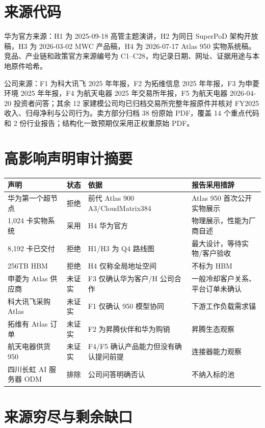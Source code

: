 \section{来源代码}

华为官方来源：H1 为 2025-09-18 高管主题演讲，H2 为同日 SuperPoD 架构开放稿，H3 为 2026-03-02 MWC 产品稿，H4 为 2026-07-17 Atlas 950 实物系统稿。竞品、产业链和政策官方来源编号为 C1--C28，均记录日期、网址、证据用途与本地原件哈希。

公司来源：F1 为科大讯飞 2025 年年报，F2 为拓维信息 2025 年年报，F3 为申菱环境 2025 年年报，F4 为航天电器 2025 年交易所年报，F5 为航天电器 2026-04-20 投资者问答；其余 12 家建模公司均已归档交易所完整年报原件并核对 FY2025 收入、归母净利与公司行为。卖方部分归档 38 份原始 PDF，覆盖 14 个重点代码和 2 份行业报告；结构化一致预期仅采用正权重原始 PDF。

\section{高影响声明审计摘要}

\begin{longtable}{L{4.0cm}L{2.4cm}L{3.4cm}L{3.4cm}}
\toprule
\textbf{声明} & \textbf{状态} & \textbf{依据} & \textbf{报告采用措辞}\\
\midrule
\endhead
华为第一个超节点 & 拒绝 & 前代 Atlas 900 A3/CloudMatrix384 & Atlas 950 首次公开实物展示\\
1,024 卡实物系统 & 采用 & H4 华为官方 & 物理展示，性能为厂商自述\\
8,192 卡已交付 & 拒绝 & H1/H3 为 Q4 路线图 & 最大设计，等待实物/客户验收\\
256TB HBM & 拒绝 & H4 仅称全局地址空间 & 不标为 HBM\\
申菱为 Atlas 供应商 & 未证实 & F3 仅确认华为客户/H 公司合作 & 一般冷却客户关系、平台订单未确认\\
科大讯飞采购 Atlas & 未证实 & F1 仅确认 950 模型协同 & 下游工作负载需求锚\\
拓维有 Atlas 订单 & 未证实 & F2 为昇腾伙伴和华为购销 & 昇腾生态观察\\
航天电器供货 950 & 未证实 & F4/F5 确认产品能力但没有确认提问前提 & 连接器能力观察\\
四川长虹 AI 服务器 ODM & 排除 & 公司问答明确否认 & 不纳入标的池\\
\bottomrule
\end{longtable}

\section{来源穷尽与剩余缺口}

